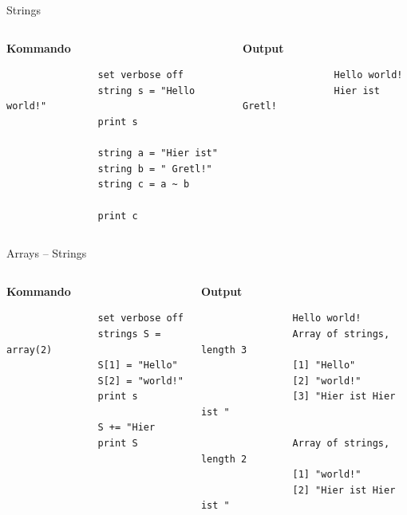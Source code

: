 \documentclass{beamer}[11pt]
\begin{document}
\begin{frame}[fragile]{Strings}
	\begin{columns}[T] %
		\begin{column}{.5\textwidth}
			\textbf{Kommando}
			\begin{verbatim}
				set verbose off
				string s = "Hello world!"
				print s

				string a = "Hier ist"
				string b = " Gretl!"
				string c = a ~ b

				print c
			\end{verbatim}
		\end{column}

		\begin{column}{.5\textwidth}
			\textbf{Output}
			\begin{verbatim}
				Hello world!
				Hier ist Gretl!
			\end{verbatim}
	  \end{column}
	\end{columns}
\end{frame}


\begin{frame}[fragile]{Arrays -- Strings}
	\begin{columns}[T] %
		\begin{column}{.5\textwidth}
			\textbf{Kommando}
			\begin{verbatim}
				set verbose off
				strings S = array(2)
				S[1] = "Hello"
				S[2] = "world!"
				print s

				S += "Hier
				print S
			\end{verbatim}
		\end{column}

		\begin{column}{.5\textwidth}
			\textbf{Output}
			\begin{verbatim}
				Hello world!
				Array of strings, length 3
				[1] "Hello"
				[2] "world!"
				[3] "Hier ist Hier ist "

				Array of strings, length 2
				[1] "world!"
				[2] "Hier ist Hier ist "
			\end{verbatim}
	  \end{column}
	\end{columns}
\end{frame}
\end{document}
